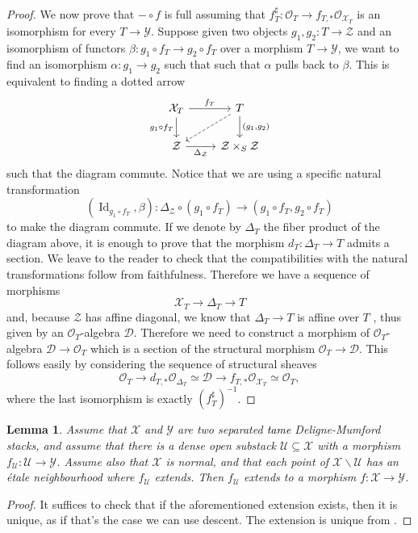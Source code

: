 \documentclass{amsart}
\newcommand{\cD}{\mathcal{D}}
\newcommand{\cO}{\mathcal{O}}
\newcommand{\cU}{\mathcal{U}}
\newcommand{\cX}{\mathcal{X}}
\newcommand{\cY}{\mathcal{Y}}
\newcommand{\cZ}{\mathcal{Z}}
\newcommand{\Id}{\operatorname{Id}}
\newtheorem{Lemma}[theorem]{Lemma}
\theoremstyle{definition}
\begin{document}
\begin{proof}
We now prove that $- \circ f$ is full assuming that $f^{\sharp}_T:\cO_{T}\rightarrow f_{T,*}\cO_{\cX_T}$ is an isomorphism for every $T\rightarrow \cY$.
Suppose given two objects $g_1,g_2:T\rightarrow \cZ$ and an isomorphism of functors $\beta:g_1 \circ f_T \rightarrow g_2 \circ f_T$ over a morphism $T\rightarrow \cY$, we want to find an isomorphism $\alpha:g_1 \rightarrow g_2$ such that such that $\alpha$ pulls back to $\beta$. This is equivalent to finding a dotted arrow 
$$
\begin{tikzcd}
\cX_T \arrow[r, "f_T"] \arrow[d, "g_1 \circ f_T"'] & T \arrow[d, "{(g_1,g_2)}"] \arrow[ld, dashed] \\
\cZ \arrow[r, "\Delta_{\cZ}"']                     & \cZ \times_S \cZ                       \end{tikzcd}
$$
such that the diagram commute. Notice that we are using a specific natural transformation $$(\Id_{g_1\circ f_T},\beta):\Delta_{\cZ} \circ (g_1\circ f_T) \rightarrow (g_1\circ f_T,g_2 \circ f_T)$$ to make the diagram commute. If we denote by $\Delta_{T}$ the fiber product of the diagram above, it is enough to prove that the morphism $d_T:\Delta_{T}\rightarrow T$ admits a section. We leave to the reader to check that the compatibilities with the natural transformations follow from faithfulness. Therefore we have a sequence of morphisms 
$$ \cX_T \rightarrow \Delta_T \rightarrow T$$
and, because $\cZ$ has affine diagonal, we know that $\Delta_T\rightarrow T$ is affine over $T$ , thus given by an $\cO_T$-algebra $\cD$. Therefore we need to construct a morphism of $\cO_T$-algebra $\cD \rightarrow \cO_T$ which is a section of the structural morphism $\cO_T \rightarrow \cD$. This follows easily by considering the sequence of structural sheaves
$$ \cO_T \rightarrow d_{T,*}\cO_{\Delta_T}\simeq\cD \rightarrow f_{T,*}\cO_{\cX_T}\simeq\cO_T,$$
where the last isomorphism is exactly $(f_T^{\sharp})^{-1}$.
\end{proof}
\begin{Lemma}\label{lemma_extension_on_open_and_etale_neigh_of_complement}
    Assume that $\cX$ and $\cY$ are two separated \textcolor{black}{tame} Deligne-Mumford stacks, and assume that there is a dense open substack $\cU\subseteq \cX$ with a morphism $f_\cU:\cU\to \cY$. Assume also that $\cX$ is normal, and that each point of $\cX\smallsetminus \cU$ has an \'etale neighbourhood where $f_\cU$ extends. Then $f_\cU$ extends to a morphism $f:\cX\to \cY$. 
\end{Lemma}
\begin{proof}It suffices to check that if the aforementioned extension exists, then it is unique, as if that's the case we can use descent. The extension is unique from \cite[Lem. 7.2]{DH18}.
\end{proof}
\end{document}
